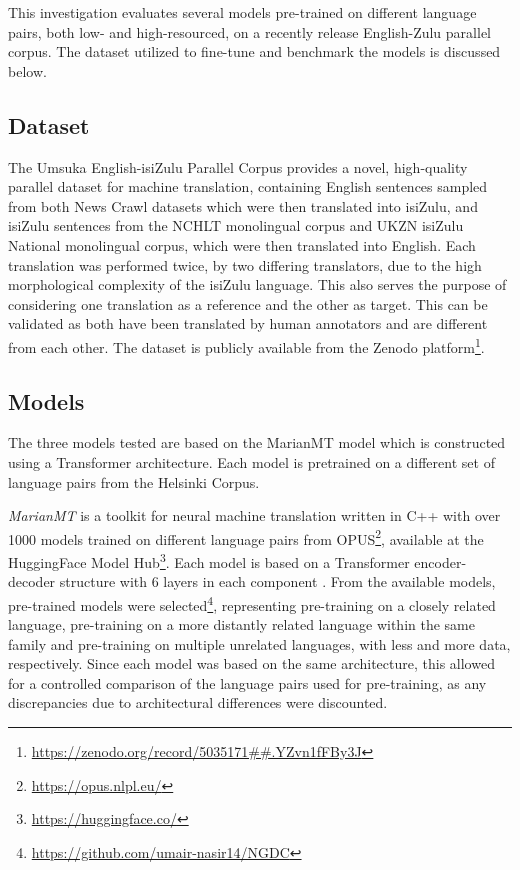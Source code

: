 \documentclass[11pt]{article}
\begin{document}
This investigation evaluates several models pre-trained on different language pairs, both low- and high-resourced, on a recently release English-Zulu parallel corpus. The dataset utilized to fine-tune and benchmark the models is discussed below. 

\subsection{Dataset}

The Umsuka English-isiZulu Parallel Corpus \citep{zulu_corpus} provides a novel, high-quality parallel dataset for machine translation, containing English sentences sampled from both News Crawl datasets which were then translated into isiZulu, and isiZulu sentences from the NCHLT monolingual corpus and UKZN isiZulu National monolingual corpus, which were then translated into English. Each translation was performed twice, by two differing translators, due to the high morphological complexity of the isiZulu language. This also serves the purpose of considering one translation as a reference and the other as target. This can be validated as both have been translated by human annotators and are different from each other. The dataset is publicly available from the Zenodo platform\footnote{\url{https://zenodo.org/record/5035171##.YZvn1fFBy3J}}. 



\subsection{Models}

The three models tested are based on the MarianMT model \citep{junczys2018marian} which is constructed using a Transformer architecture. Each model is pretrained on a different set of language pairs from the Helsinki Corpus. 


\emph{MarianMT} \citep{junczys2018marian} is a toolkit for neural machine translation written in C++ with over 1000 models trained on different language pairs from OPUS\footnote{\url{https://opus.nlpl.eu/}}, available at the HuggingFace Model Hub\footnote{\url{https://huggingface.co/}}. Each model is based on a Transformer encoder-decoder structure with 6 layers in each component \citep{junczys2018marian}. From the available models,  pre-trained models were selected\footnote{\url{https://github.com/umair-nasir14/NGDC}}, representing pre-training on a closely related language, pre-training on a more distantly related language within the same family and pre-training on multiple unrelated languages, with less and more data, respectively. Since each model was based on the same architecture, this allowed for a controlled comparison of the language pairs used for pre-training,  as any discrepancies due to architectural differences were discounted.
\end{document}
